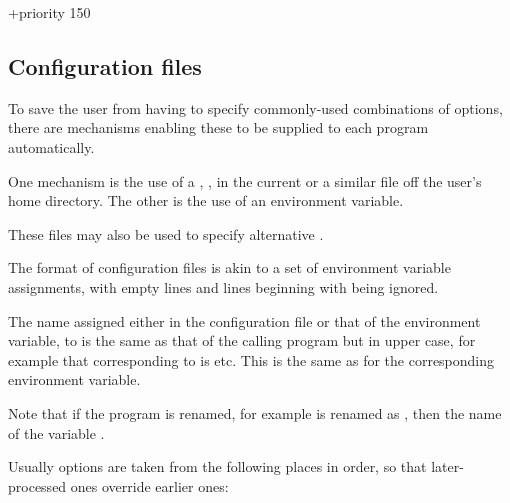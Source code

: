 \begin{expara}

+priority 150

\end{expara}

\subsection{Configuration files}
To save the user from having to specify commonly-used combinations of options, there are mechanisms enabling these to be supplied to each
program automatically.

One mechanism is the use of a , \configurationfile{},
in the current or a similar file \linebreak[20]\homeconfigpath{} off the user's home directory. The other is the use of an environment variable.

These files may also be used to specify alternative .

The format of configuration files is akin to a set of environment variable assignments, with empty lines and lines beginning with
\exampletext{\#} being ignored.

The name assigned either in the configuration file or that of the environment variable,
to is the same as that of the calling program but in upper case,
for example that corresponding to \PrBtr{} is \filename{\BtrVarname} etc. This is the same as for the corresponding environment variable.

Note that if the program is renamed, for example \PrBtr{} is renamed as , then the name of the variable .

Usually options are taken from the following places in order, so that later-processed ones override earlier ones:

